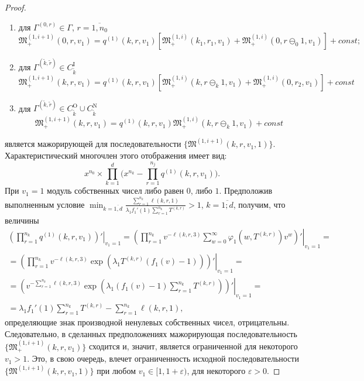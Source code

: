 \documentclass{report}
\begin{document}
\begin{proof}
\begin{enumerate}
\item для $ \Gamma^{(0,r)} \in \Gamma$, $r = \overline{1,n_0}$ 
$$
\mathfrak{M}_+^{(1,i+1)}(0,r,v_1) = q^{(1)}(k,r,v_1)
[\mathfrak{M}_+^{(1,i)}(k_1, r_1,v_1) +\mathfrak{M}_+^{(1,i)}(0, r\ominus_0 1,v_1) ] + const;
$$
\item для $\Gamma^{(\tilde{k},\tilde{r})} \in C_{\tilde{k}}^{\mathrm{I}}$
\begin{equation*}
 \mathfrak{M}_+^{(1,i+1)}(k,r,v_1) = q^{(1)}(k,r,v_1) [ \mathfrak{M}_+^{(1,i)}(k,r\ominus_{k}1,v_1) +\mathfrak{M}_+^{(1,i)}(0,r_2,v_1) ]+ const
\end{equation*}
\item для $\Gamma^{(\tilde{k},\tilde{r})} \in C_{\tilde{k}}^{\mathrm{O}} \cup C_{\tilde{k}}^{\mathrm{N}}$
\begin{equation*}
\mathfrak{M}_+^{(1,i+1)}(k,r,v_1) = q^{(1)}(k,r,v_1) \mathfrak{M}_+^{(1,i)}(k,r\ominus_k 1,v_1) + const
\end{equation*}
\end{enumerate}
является мажорирующей для последовательности $\{\mathfrak{M}^{(1,i+1)}(k,r,v_1,1)\}$.
Характеристический многочлен этого отображения имеет вид:
$$
x^{n_0} \times \prod_{k=1}^{d} \big(x^{n_k} - \prod_{r=1}^{n_j}q^{(1)}(k,r,v_1)\big).
$$
При $v_1=1$ модуль собственных чисел либо равен $0$, либо $1$.
Предположив выполненным условие $\min_{k=\overline{1,d}} { \frac{\sum_{r = 1}^{n_k} \ell(k,r,1) }{\lambda_1 f_1'(1) \sum_{r=1}^{n_k} T^{(k,r)} }}>1$, $k=\overline{1;d}$, получим, что величины
\begin{multline}
 \left.\left(\prod_{r=1}^{n_k}q^{(1)}(k,r,v_1)\right) ' \right|_{v_1=1} = 
  \left.\left(\prod_{r=1}^{n_k}v^{-\ell(k,r,3)}\sum_{w=0}^{\infty} \varphi_1(w,T^{(k,r)})v^w \right) ' \right|_{v_1=1} = \\ =
   \left.\left(\prod_{r=1}^{n_k} v^{-\ell(k,r,3)}\exp(\lambda_1 T^{(k,r)} (f_1(v)-1))\right) ' \right|_{v_1=1} = \\ =
    \left.\left(v^{-\sum_{r=1}^{n_k}\ell(k,r,3)}\exp(\lambda_1 (f_1(v)-1)\sum_{r=1}^{n_k} T^{(k,r)}) \right) ' \right|_{v_1=1} = \\ =
\lambda_1 f_1'(1) \sum_{r=1}^{n_k} T^{(k,r)} -\sum_{r=1}^{n_k} \ell(k,r,1), 
\label{derivative:cycle}
\end{multline}
определяющие знак производной ненулевых собственных чисел, отрицательны. Следовательно, в сделанных предположениях мажорирующая последовательность \linebreak $\{\mathfrak{M}_+^{(1,i+1)}(k,r,v_1)\}$ сходится и, значит, является ограниченной для некоторого $v_1>1$. Это, в свою очередь, влечет ограниченность исходной последовательности \linebreak $\{\mathfrak{M}^{(1,i+1)}(k,r,v_1,1)\}$ при любом $v_1 \in [1, 1+\varepsilon)$, для некоторого $\varepsilon > 0$.

\end{proof}
\end{document}
